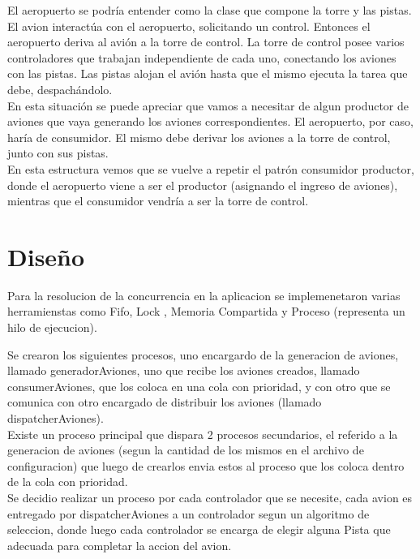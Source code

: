 \documentclass[a4paper,12pt,titlepage]{article}
\begin{document}
El aeropuerto se podría entender como la clase que compone la torre y las pistas. El avion interactúa con el
aeropuerto, solicitando un control. Entonces el aeropuerto deriva al avión a la torre de control.
La torre de control posee varios controladores que trabajan independiente de cada uno, conectando los aviones
con las pistas. Las pistas alojan el avión hasta que el mismo ejecuta la tarea que debe, despachándolo.\\

En esta situación se puede apreciar que vamos a necesitar de algun productor de aviones
que vaya generando los aviones correspondientes. El aeropuerto, por caso, haría de consumidor.
El mismo debe derivar los aviones a la torre de control, junto con sus pistas.\\
En esta estructura vemos que se vuelve a repetir el patrón consumidor productor, donde el aeropuerto
viene a ser el productor (asignando el ingreso de aviones), mientras que el consumidor vendría a ser la torre de control.\\


\newpage
\section{Diseño}

Para la resolucion de la concurrencia en la aplicacion se implemenetaron varias herramienstas como Fifo, Lock , Memoria Compartida y Proceso (representa un hilo de ejecucion).

Se crearon los siguientes procesos, uno encargardo de la generacion de aviones, llamado generadorAviones, uno que recibe los aviones creados, llamado consumerAviones, que los coloca en una cola con prioridad, y con otro que se comunica con otro encargado de distribuir los aviones (llamado 
dispatcherAviones).\\

Existe un proceso principal que dispara 2 procesos secundarios, el referido a la generacion de aviones (segun la
cantidad de los mismos en el archivo de configuracion) que luego de crearlos envia estos al proceso que los
coloca dentro de la cola con prioridad.\\

Se decidio realizar un proceso por cada controlador que se necesite, cada avion es entregado por dispatcherAviones a un controlador segun un algoritmo de seleccion, donde luego cada controlador se encarga de elegir alguna Pista que adecuada para completar la accion del avion.\\
\end{document}
